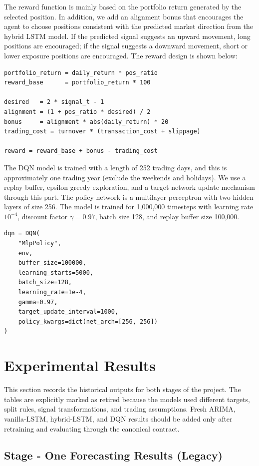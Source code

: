 \documentclass{article}
\begin{document}
The reward function is mainly based on the portfolio return generated by the selected position. In addition, we add an alignment bonus that encourages the agent to choose positions consistent with the predicted market direction from the hybrid LSTM model. If the predicted signal suggests an upward movement, long positions are encouraged; if the signal suggests a downward movement, short or lower exposure positions are encouraged. The reward design is shown below:

\begin{verbatim}
portfolio_return = daily_return * pos_ratio
reward_base      = portfolio_return * 100

desired   = 2 * signal_t - 1
alignment = (1 + pos_ratio * desired) / 2
bonus     = alignment * abs(daily_return) * 20
trading_cost = turnover * (transaction_cost + slippage)

reward = reward_base + bonus - trading_cost
\end{verbatim}

The DQN model is trained with a length of 252 trading days, and this is approximately one trading year (exclude the weekends and holidays). We use a replay buffer, epsilon greedy exploration, and a target network update mechanism through this part. The policy network is a multilayer perceptron with two hidden layers of size 256. The model is trained for 1,000,000 timesteps with learning rate $10^{-4}$, discount factor $\gamma = 0.97$, batch size 128, and replay buffer size 100,000.

\begin{verbatim}
dqn = DQN(
    "MlpPolicy",
    env,
    buffer_size=100000,
    learning_starts=5000,
    batch_size=128,
    learning_rate=1e-4,
    gamma=0.97,
    target_update_interval=1000,
    policy_kwargs=dict(net_arch=[256, 256])
)
\end{verbatim}

\section{Experimental Results}

This section records the historical outputs for both stages of the project. The tables are explicitly marked as retired because the models used different targets, split rules, signal transformations, and trading assumptions. Fresh ARIMA, vanilla-LSTM, hybrid-LSTM, and DQN results should be added only after retraining and evaluating through the canonical contract.

\subsection{Stage - One Forecasting Results (Legacy)}
\end{document}
